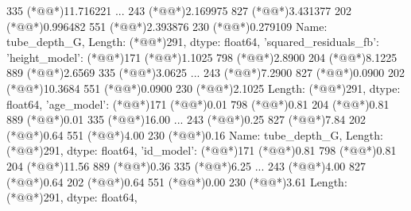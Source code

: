 \documentclass[11pt]{article}
\begin{document}
\begin{codeoutput}
{{335    (*@@*)11.716221
         ...    
243     (*@@*)2.169975
827     (*@@*)3.431377
202     (*@@*)0.996482
551     (*@@*)2.393876
230     (*@@*)0.279109
Name: tube\_depth\_G, Length: (*@@*)291, dtype: float64},
    'squared\_residuals\_fb': {'height\_model': (*@@*)171     (*@@*)1.1025
798     (*@@*)2.8900
204     (*@@*)8.1225
889     (*@@*)2.6569
335     (*@@*)3.0625
        ...   
243     (*@@*)7.2900
827     (*@@*)0.0900
202    (*@@*)10.3684
551     (*@@*)0.0900
230     (*@@*)2.1025
Length: (*@@*)291, dtype: float64, 'age\_model': (*@@*)171     (*@@*)0.01
798     (*@@*)0.81
204     (*@@*)0.81
889     (*@@*)0.01
335    (*@@*)16.00
       ...  
243     (*@@*)0.25
827     (*@@*)7.84
202     (*@@*)0.64
551     (*@@*)4.00
230     (*@@*)0.16
Name: tube\_depth\_G, Length: (*@@*)291, dtype: float64, 'id\_model': (*@@*)171     (*@@*)0.81
798     (*@@*)0.81
204    (*@@*)11.56
889     (*@@*)0.36
335     (*@@*)6.25
       ...  
243     (*@@*)4.00
827     (*@@*)0.64
202     (*@@*)0.64
551     (*@@*)0.00
230     (*@@*)3.61
Length: (*@@*)291, dtype: float64},
}
\end{codeoutput}
\end{document}
